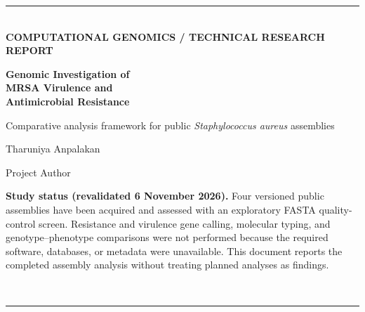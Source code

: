\documentclass[11pt,a4paper]{article}
\begin{document}
\hypersetup{pageanchor=false}

\begin{titlepage}
\thispagestyle{empty}
\vspace*{22mm}
{\color{ink}\rule{\textwidth}{1.1pt}}\\[8mm]
{\small\bfseries\color{muted}COMPUTATIONAL GENOMICS / TECHNICAL RESEARCH REPORT}\par
\vspace{18mm}
{\Huge\bfseries\color{ink}Genomic Investigation of\\[2mm]MRSA Virulence and\\[2mm]Antimicrobial Resistance\par}
\vspace{7mm}
{\large Comparative analysis framework for public \textit{Staphylococcus aureus} assemblies\par}
\vspace{17mm}
{\large Tharuniya Anpalakan\par}
{\small Project Author\par}
\vspace{5mm}
\vfill
\begin{minipage}{0.84\textwidth}
\color{muted}\small
\textbf{Study status (revalidated 6 November 2026).} Four versioned public assemblies have been acquired and assessed with an exploratory FASTA quality-control screen. Resistance and virulence gene calling, molecular typing, and genotype--phenotype comparisons were not performed because the required software, databases, or metadata were unavailable. This document reports the completed assembly analysis without treating planned analyses as findings.
\end{minipage}
\vspace{12mm}\\
{\color{ink}\rule{\textwidth}{0.6pt}}
\end{titlepage}
\hypersetup{pageanchor=true}
\end{document}
